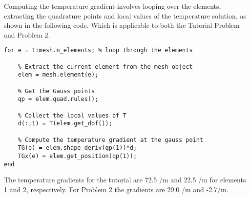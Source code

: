Computing the temperature gradient involves looping over the elements, extracting the quadrature points and local values of the temperature solution, as shown in the following code. Which is applicable to both the Tutorial Problem and Problem 2.
\begin{lstlisting}
for e = 1:mesh.n_elements; % loop through the elements
    
    % Extract the current element from the mesh object
    elem = mesh.element(e);
    
    % Get the Gauss points
    qp = elem.quad.rules();
    
    % Collect the local values of T
    d(:,1) = T(elem.get_dof());
    
    % Compute the temperature gradient at the gauss point
    TG(e) = elem.shape_deriv(qp(1))*d;
    TGx(e) = elem.get_position(qp(1));   
end    
\end{lstlisting}
The temperature gradients for the tutorial are 72.5 \C/m and 22.5 \C/m for elements 1 and 2, respectively. For Problem 2 the gradients are 29.0 \C/m and -2.7\C/m.